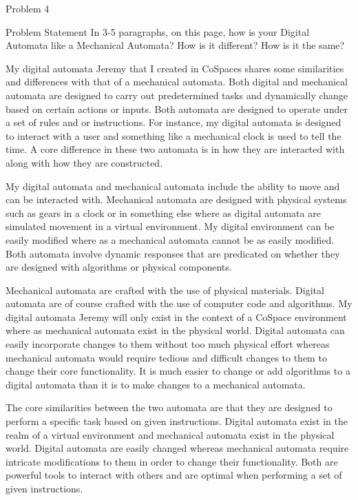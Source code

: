 \begin{problem}{Problem 4}
    \begin{statement}{Problem Statement}
        In 3-5 paragraphs, on this page, how is your Digital Automata like a Mechanical Automata? How is it different? How is it the same?
    \end{statement}

    \begin{highlight}[Response]
        My digital automata Jeremy that I created in CoSpaces shares some similarities and differences with that of a mechanical automata. Both digital and mechanical automata are designed to carry out predetermined tasks
        and dynamically change based on certain actions or inputs. Both automata are designed to operate under a set of rules and or instructions. For instance, my digital automata is designed to interact with a user and 
        something like a mechanical clock is used to tell the time. A core difference in these two automata is in how they are interacted with along with how they are constructed.

        My digital automata and mechanical automata include the ability to move and can be interacted with. Mechanical automata are designed with physical systems such as gears in a clock or in something else where as digital
        automata are simulated movement in a virtual environment. My digital environment can be easily modified where as a mechanical automata cannot be as easily modified. Both automata involve dynamic responses that are
        predicated on whether they are designed with algorithms or physical components.

        Mechanical automata are crafted with the use of physical materials. Digital automata are of course crafted with the use of computer code and algorithms. My digital automata Jeremy will only exist in the context of
        a CoSpace environment where as mechanical automata exist in the physical world. Digital automata can easily incorporate changes to them without too much physical effort whereas mechanical automata would require tedious
        and difficult changes to them to change their core functionality. It is much easier to change or add algorithms to a digital automata than it is to make changes to a mechanical automata.

        The core similarities between the two automata are that they are designed to perform a specific task based on given instructions. Digital automata exist in the realm of a virtual environment and mechanical automata exist
        in the physical world. Digital automata are easily changed whereas mechanical automata require intricate modifications to them in order to change their functionality. Both are powerful tools to interact with others and 
        are optimal when performing a set of given instructions.
    \end{highlight}
\end{problem}

